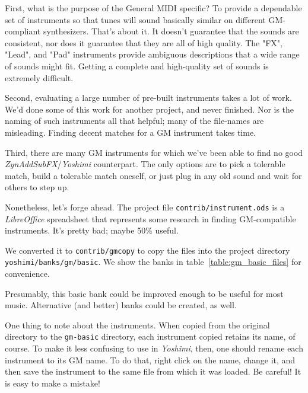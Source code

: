    First, what is the purpose of the General MIDI specific?
   To provide a
   dependable set of instruments so that tunes will sound basically similar
   on different GM-compliant synthesizers.  That's about it.  It doesn't
   guarantee that the sounds are consistent, nor does it guarantee that they
   are all of high quality.  The "FX", "Lead", and "Pad" instruments provide
   ambiguous descriptions that a wide range of sounds might fit.
   Getting a complete and high-quality set of sounds is extremely difficult.

   Second, evaluating a large number of pre-built instruments takes a lot of
   work.  We'd done some of this work for another project, and never
   finished.  Nor is the naming of such instruments all that helpful; many
   of the file-names are misleading.  Finding decent matches for a GM
   instrument takes time.

   Third, there are many GM instruments for which we've been able to find no
   good \textsl{ZynAddSubFX}/\textsl{Yoshimi} counterpart.  The only options
   are to pick a tolerable match, build a tolerable match oneself, or just
   plug in any old sound and wait for others to step up.

   Nonetheless, let's forge ahead.  The project file
   \texttt{contrib/instrument.ods}
   is a \textsl{LibreOffice} spreadsheet
   that represents some research in finding GM-compatible instruments.
   It's pretty bad; maybe 50\% useful.

   We converted it to \texttt{contrib/gmcopy} to copy the files
   into the project directory \texttt{yoshimi/banks/gm/basic}.
   We show the banks in table~\ref{table:gm_basic_files}
   for convenience.




   Presumably, this basic bank could be improved enough to be useful
   for most music.  Alternative (and better) banks could be created, as
   well.

   One thing to note about the instruments.  When copied from the original
   directory to the \texttt{gm-basic} directory, each instrument copied
   retains its name, of course.  To make it less confusing to use in
   \textsl{Yoshimi}, then, one should rename each instrument to its GM name.
   To do that, right click on the name, change it, and then save the
   instrument to the same file from which it was loaded.  Be careful!
   It is easy to make a mistake!  

